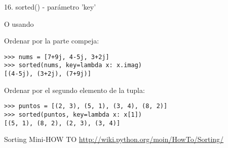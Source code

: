 \begin{frame}[fragile]{16. sorted() - parámetro 'key'}
  \begin{block}{}
    \centering
    O usando 
  \end{block}

  \footnotesize
  \begin{exampleblock}
    {Ordenar por la parte compeja:}
    \begin{lstlisting}
>>> nums = [7+9j, 4-5j, 3+2j]
>>> sorted(nums, key=lambda x: x.imag)
[(4-5j), (3+2j), (7+9j)]
    \end{lstlisting}
  \end{exampleblock}

  \begin{exampleblock}
    {Ordenar por el segundo elemento de la tupla:}
    \begin{lstlisting}
>>> puntos = [(2, 3), (5, 1), (3, 4), (8, 2)]
>>> sorted(puntos, key=lambda x: x[1])
[(5, 1), (8, 2), (2, 3), (3, 4)]
    \end{lstlisting}
  \end{exampleblock}

  \begin{block}
    {\centering Sorting Mini-HOW TO}
    \centering \url{http://wiki.python.org/moin/HowTo/Sorting/}
  \end{block}
\end{frame}
